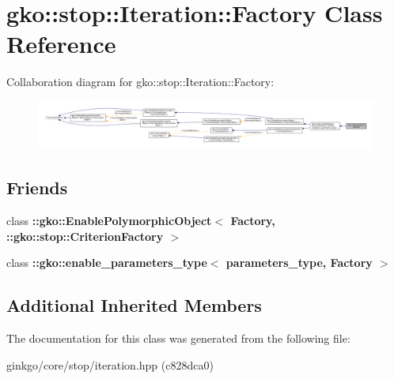 \hypertarget{classgko_1_1stop_1_1Iteration_1_1Factory}{}\section{gko\+:\+:stop\+:\+:Iteration\+:\+:Factory Class Reference}
\label{classgko_1_1stop_1_1Iteration_1_1Factory}


Collaboration diagram for gko\+:\+:stop\+:\+:Iteration\+:\+:Factory\+:
\nopagebreak
\begin{figure}[H]
\begin{center}
\leavevmode
\includegraphics[width=350pt]{classgko_1_1stop_1_1Iteration_1_1Factory__coll__graph}
\end{center}
\end{figure}
\subsection*{Friends}
\begin{DoxyCompactItemize}
\item 
\mbox{\label{classgko_1_1stop_1_1Iteration_1_1Factory_aaa5507cf00e5361a77971746fefa42e6}} 
class {\bfseries \+::gko\+::\+Enable\+Polymorphic\+Object$<$ Factory, \+::gko\+::stop\+::\+Criterion\+Factory $>$}
\item 
\mbox{\label{classgko_1_1stop_1_1Iteration_1_1Factory_a0d176cbd42d6214e11aee8c30ca256fc}} 
class {\bfseries \+::gko\+::enable\+\_\+parameters\+\_\+type$<$ parameters\+\_\+type, Factory $>$}
\end{DoxyCompactItemize}
\subsection*{Additional Inherited Members}


The documentation for this class was generated from the following file\+:\begin{DoxyCompactItemize}
\item 
ginkgo/core/stop/iteration.\+hpp (c828dca0)\end{DoxyCompactItemize}
